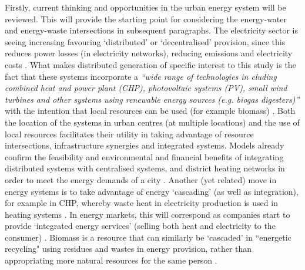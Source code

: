 Firstly, current thinking and opportunities in the urban energy system will be  reviewed. This will provide the starting point for considering the energy-water and energy-waste intersections in subsequent paragraphs. The electricity sector is seeing increasing favouring `distributed' or `decentralised' provision, since this reduces power losses (in electricity networks), reducing emissions and electricity costs \citep{Fleten2007}. What makes distributed generation of specific interest to this study is the fact that these systems incorporate a \emph{``wide range of technologies in cluding combined heat and power plant (CHP), photovoltaic systems (PV), small wind turbines and other systems using renewable energy sources (e.g. biogas digesters)''} with the intention that local resources can be used (for example biomass) \citep[p. 1001]{Ren2010}. Both the location of the systems in urban centres (at multiple locations) and the use of local resources facilitates their utility in taking advantage of resource intersections, infrastructure synergies and integrated systems. Models already confirm the feasibility and environmental and financial benefits of integrating distributed systems with centralised systems, and district heating networks in order to meet the energy demands of a city \citep{Weber2011}. Another (yet related) move in energy systems is to take advantage of energy `cascading' (as well as integration), for example in CHP, whereby waste heat in electricity production is used in heating systems \citep{Grubler2009}. In energy markets, this will correspond as companies start to provide `integrated energy services' (selling both heat and electricity to the consumer) \citep{Sugihara2004}. Biomass is a resource that can similarly be `cascaded' in ``energetic recycling" using residues and wastes in energy provision, rather than appropriating more natural resources for the same person \citep{Haberl2001a}.

